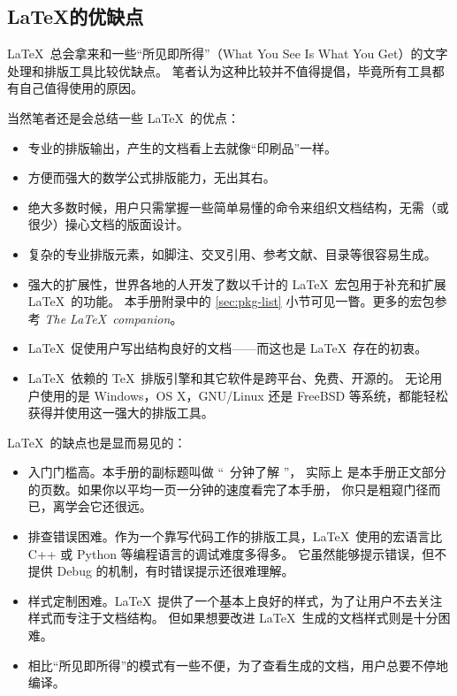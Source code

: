\subsection{\LaTeX 的优缺点}\label{subec:advs}

\LaTeX\ 总会拿来和一些“所见即所得”（What You See Is What You Get）的文字处理和排版工具比较优缺点。
笔者认为这种比较并不值得提倡，毕竟所有工具都有自己值得使用的原因。

当然笔者还是会总结一些 \LaTeX\ 的优点：

\begin{itemize}
  \item 专业的排版输出，产生的文档看上去就像“印刷品”一样。

  \item 方便而强大的数学公式排版能力，无出其右。

  \item 绝大多数时候，用户只需掌握一些简单易懂的命令来组织文档结构，无需（或很少）操心文档的版面设计。

  \item 复杂的专业排版元素，如脚注、交叉引用、参考文献、目录等很容易生成。

  \item 强大的扩展性，世界各地的人开发了数以千计的 \LaTeX\ 宏包用于补充和扩展 \LaTeX\ 的功能。
  本手册附录中的 \ref{sec:pkg-list} 小节可见一瞥。更多的宏包参考 \textit{The \LaTeX\ companion}\cite{companion}。

  \item \LaTeX\ 促使用户写出结构良好的文档——而这也是 \LaTeX\ 存在的初衷。

  \item \LaTeX\ 依赖的 \TeX\ 排版引擎和其它软件是跨平台、免费、开源的。
  无论用户使用的是 Windows，OS X，GNU/Linux 还是 FreeBSD 等系统，都能轻松获得并使用这一强大的排版工具。
\end{itemize}

\LaTeX\ 的缺点也是显而易见的：
\begin{itemize}
  \item 入门门槛高。本手册的副标题叫做 “\pageref{lshort-minutes}~分钟了解 \LaTeXe ”，
  实际上 \pageref{lshort-minutes} 是本手册正文部分的页数。如果你以平均一页一分钟的速度看完了本手册，
  你只是粗窥门径而已，离学会它还很远。

  \item 排查错误困难。作为一个靠写代码工作的排版工具，\LaTeX\ 使用的宏语言比 C++ 或 Python 等编程语言的调试难度多得多。
  它虽然能够提示错误，但不提供 Debug 的机制，有时错误提示还很难理解。

  \item 样式定制困难。\LaTeX\ 提供了一个基本上良好的样式，为了让用户不去关注样式而专注于文档结构。
  但如果想要改进 \LaTeX\ 生成的文档样式则是十分困难。

  \item 相比“所见即所得”的模式有一些不便，为了查看生成的文档，用户总要不停地编译。
\end{itemize}

